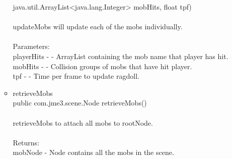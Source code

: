 \documentclass[letterpaper]{article}
\begin{document}
\begin{itemize}
\begin{itemize}
															java.util.ArrayList<java.lang.Integer> mobHits,
															float tpf) \\ \\
															updateMobs will update each of the mobs individually. \\ \\
															Parameters: \\
															playerHits - - ArrayList containing the mob name that player has hit. \\
															mobHits - - Collision groups of mobs that have hit player. \\
															tpf - - Time per frame to update ragdoll. \\
													\item	retrieveMobs \\
															public com.jme3.scene.Node retrieveMobs() \\ \\
															retrieveMobs to attach all mobs to rootNode. \\ \\
															Returns: \\
															mobNode - Node contains all the mobs in the scene.
												\end{itemize}
									\end{itemize}
								
								\vspace{0.2in}
\end{document}
